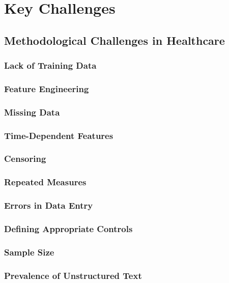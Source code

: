 \chapter{Key Challenges}

\section{Methodological Challenges in Healthcare}

\subsection{Lack of Training Data}

\subsection{Feature Engineering}

\subsection{Missing Data}

\subsection{Time-Dependent Features}

\subsection{Censoring}

\subsection{Repeated Measures}

\subsection{Errors in Data Entry}

\subsection{Defining Appropriate Controls}

\subsection{Sample Size}

\subsection{Prevalence of Unstructured Text}